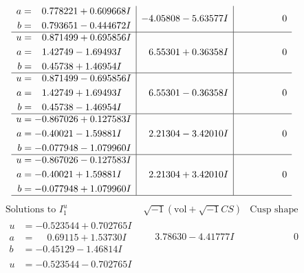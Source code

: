 \documentclass[1p]{elsarticle_modified}
\theoremstyle{definition}
\newcommand{\I}{\sqrt{-1}}
\begin{document}
$$\begin{array}{c|c|c}
\begin{aligned}
a &= \phantom{-}0.778221 + 0.609668 I \\
b &= \phantom{-}0.793651 - 0.444672 I\end{aligned}
 & -4.05808 - 5.63577 I & \phantom{-0.000000 } 0 \\ \hline\begin{aligned}
u &= \phantom{-}0.871499 + 0.695856 I \\
a &= \phantom{-}1.42749 - 1.69493 I \\
b &= \phantom{-}0.45738 + 1.46954 I\end{aligned}
 & \phantom{-}6.55301 + 0.36358 I & \phantom{-0.000000 } 0 \\ \hline\begin{aligned}
u &= \phantom{-}0.871499 - 0.695856 I \\
a &= \phantom{-}1.42749 + 1.69493 I \\
b &= \phantom{-}0.45738 - 1.46954 I\end{aligned}
 & \phantom{-}6.55301 - 0.36358 I & \phantom{-0.000000 } 0 \\ \hline\begin{aligned}
u &= -0.867026 + 0.127583 I \\
a &= -0.40021 - 1.59881 I \\
b &= -0.077948 - 1.079960 I\end{aligned}
 & \phantom{-}2.21304 - 3.42010 I & \phantom{-0.000000 } 0 \\ \hline\begin{aligned}
u &= -0.867026 - 0.127583 I \\
a &= -0.40021 + 1.59881 I \\
b &= -0.077948 + 1.079960 I\end{aligned}
 & \phantom{-}2.21304 + 3.42010 I & \phantom{-0.000000 } 0\\
 \hline 
 \end{array}$$\newpage$$\begin{array}{c|c|c}  
\text{Solutions to }I^u_{1}& \I (\text{vol} + \sqrt{-1}CS) & \text{Cusp shape}\\
 \hline 
\begin{aligned}
u &= -0.523544 + 0.702765 I \\
a &= \phantom{-}0.69115 + 1.53730 I \\
b &= -0.45129 - 1.46814 I\end{aligned}
 & \phantom{-}3.78630 - 4.41777 I & \phantom{-0.000000 } 0 \\ \hline\begin{aligned}
u &= -0.523544 - 0.702765 I \\

\end{aligned}
\end{array}$$
\end{document}
